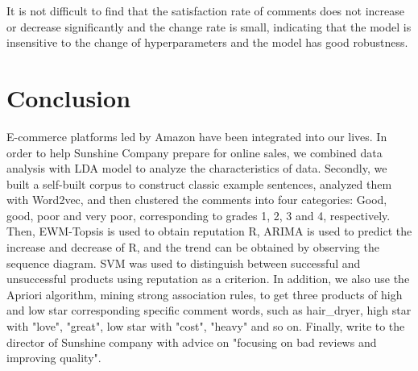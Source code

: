 \documentclass[../mcmpaper]{subfiles}
\begin{document}
    \par
    It is not difficult to find that the satisfaction rate of comments does not increase or decrease significantly and the change rate is small, indicating that the model is insensitive to the change of hyperparameters and the model has good robustness.
    \section{Conclusion}
    E-commerce platforms led by Amazon have been integrated into our lives. In order to help Sunshine Company prepare for online sales, we combined data analysis with LDA model to analyze the characteristics of data. Secondly, we built a self-built corpus to construct classic example sentences, analyzed them with Word2vec, and then clustered the comments into four categories: Good, good, poor and very poor, corresponding to grades 1, 2, 3 and 4, respectively. Then, EWM-Topsis is used to obtain reputation R, ARIMA is used to predict the increase and decrease of R, and the trend can be obtained by observing the sequence diagram. SVM was used to distinguish between successful and unsuccessful products using reputation as a criterion. In addition, we also use the Apriori algorithm, mining strong association rules, to get three products of high and low star corresponding specific comment words, such as hair\_dryer, high star with "love", "great", low star with "cost", "heavy" and so on. Finally, write to the director of Sunshine company with advice on "focusing on bad reviews and improving quality".
\end{document}
